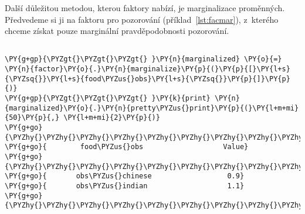 Další důležitou metodou, kterou faktory nabízí, je marginalizace proměnných.
Předvedeme si ji na faktoru pro pozorování (příklad~\ref{lst:facmar}), z~kterého chceme získat pouze marginální pravděpodobnosti pozorování.

\begin{example}
\begin{Verbatim}[commandchars=\\\{\}]

\PY{g+gp}{\PYZgt{}\PYZgt{}\PYZgt{} }\PY{n}{marginalized} \PY{o}{=} \PY{n}{factor}\PY{o}{.}\PY{n}{marginalize}\PY{p}{(}\PY{p}{[}\PY{l+s}{\PYZsq{}}\PY{l+s}{food\PYZus{}obs}\PY{l+s}{\PYZsq{}}\PY{p}{]}\PY{p}{)}
\PY{g+gp}{\PYZgt{}\PYZgt{}\PYZgt{} }\PY{k}{print} \PY{n}{marginalized}\PY{o}{.}\PY{n}{pretty\PYZus{}print}\PY{p}{(}\PY{l+m+mi}{50}\PY{p}{,} \PY{l+m+mi}{2}\PY{p}{)}
\PY{g+go}{\PYZhy{}\PYZhy{}\PYZhy{}\PYZhy{}\PYZhy{}\PYZhy{}\PYZhy{}\PYZhy{}\PYZhy{}\PYZhy{}\PYZhy{}\PYZhy{}\PYZhy{}\PYZhy{}\PYZhy{}\PYZhy{}\PYZhy{}\PYZhy{}\PYZhy{}\PYZhy{}\PYZhy{}\PYZhy{}\PYZhy{}\PYZhy{}\PYZhy{}\PYZhy{}\PYZhy{}\PYZhy{}\PYZhy{}\PYZhy{}\PYZhy{}\PYZhy{}\PYZhy{}\PYZhy{}\PYZhy{}\PYZhy{}\PYZhy{}\PYZhy{}\PYZhy{}\PYZhy{}\PYZhy{}\PYZhy{}\PYZhy{}\PYZhy{}\PYZhy{}\PYZhy{}\PYZhy{}\PYZhy{}\PYZhy{}\PYZhy{}}
\PY{g+go}{        food\PYZus{}obs                   Value}
\PY{g+go}{\PYZhy{}\PYZhy{}\PYZhy{}\PYZhy{}\PYZhy{}\PYZhy{}\PYZhy{}\PYZhy{}\PYZhy{}\PYZhy{}\PYZhy{}\PYZhy{}\PYZhy{}\PYZhy{}\PYZhy{}\PYZhy{}\PYZhy{}\PYZhy{}\PYZhy{}\PYZhy{}\PYZhy{}\PYZhy{}\PYZhy{}\PYZhy{}\PYZhy{}\PYZhy{}\PYZhy{}\PYZhy{}\PYZhy{}\PYZhy{}\PYZhy{}\PYZhy{}\PYZhy{}\PYZhy{}\PYZhy{}\PYZhy{}\PYZhy{}\PYZhy{}\PYZhy{}\PYZhy{}\PYZhy{}\PYZhy{}\PYZhy{}\PYZhy{}\PYZhy{}\PYZhy{}\PYZhy{}\PYZhy{}\PYZhy{}\PYZhy{}}
\PY{g+go}{       obs\PYZus{}chinese                  0.9}
\PY{g+go}{       obs\PYZus{}indian                   1.1}
\PY{g+go}{\PYZhy{}\PYZhy{}\PYZhy{}\PYZhy{}\PYZhy{}\PYZhy{}\PYZhy{}\PYZhy{}\PYZhy{}\PYZhy{}\PYZhy{}\PYZhy{}\PYZhy{}\PYZhy{}\PYZhy{}\PYZhy{}\PYZhy{}\PYZhy{}\PYZhy{}\PYZhy{}\PYZhy{}\PYZhy{}\PYZhy{}\PYZhy{}\PYZhy{}\PYZhy{}\PYZhy{}\PYZhy{}\PYZhy{}\PYZhy{}\PYZhy{}\PYZhy{}\PYZhy{}\PYZhy{}\PYZhy{}\PYZhy{}\PYZhy{}\PYZhy{}\PYZhy{}\PYZhy{}\PYZhy{}\PYZhy{}\PYZhy{}\PYZhy{}\PYZhy{}\PYZhy{}\PYZhy{}\PYZhy{}\PYZhy{}\PYZhy{}}
\end{Verbatim}
\caption{Marginalizace faktoru}
\label{lst:facmar}
\end{example}


